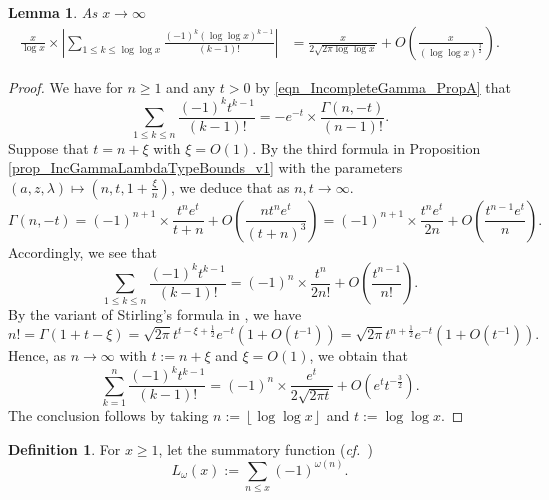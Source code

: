 \documentclass[11pt,reqno,a4letter]{article}
\newcommand{\hlocalref}[1]{\hyperref[#1]{\ref{#1}}}
\numberwithin{equation}{section}
\numberwithin{figure}{section}
\numberwithin{table}{section}
\newcommand{\cf}{\textit{cf.\ }}
\newcommand{\floor}[1]{\left\lfloor #1 \right\rfloor}
\theoremstyle{plain}
\newtheorem{lemma}[theorem]{Lemma}
\numberwithin{theorem}{section}
\theoremstyle{definition}
\newtheorem{definition}[theorem]{Definition}
\begin{document}
\begin{lemma}
\label{lemma_ConvenientIncGammaFuncTypePartialSumAsymptotics_v2}
As $x \rightarrow \infty$  
\begin{align*}
\frac{x}{\log x} \times \left\lvert \sum_{1 \leq k \leq \log\log x} 
     \frac{(-1)^k (\log\log x)^{k-1}}{(k-1)!} \right\rvert 
     & = \frac{x}{2\sqrt{2\pi \log\log x}} + O\left(\frac{x}{(\log\log x)^{\frac{3}{2}}}\right). 
\end{align*}
\end{lemma}
\begin{proof}
We have for $n \geq 1$ and any $t > 0$ by 
\eqref{eqn_IncompleteGamma_PropA} that 
\[
\sum_{1 \leq k \leq n} \frac{(-1)^k t^{k-1}}{(k-1)!} = -e^{-t} \times 
     \frac{\Gamma(n, -t)}{(n-1)!}. 
\]
Suppose that $t = n + \xi$ with $\xi = O(1)$. 
By the third formula 
in Proposition \hlocalref{prop_IncGammaLambdaTypeBounds_v1} 
with the parameters $(a, z, \lambda) \mapsto \left(n, t, 1 + \frac{\xi}{n}\right)$, 
we deduce that as $n,t \rightarrow \infty$. 
\begin{equation}
\label{eqn_ProofTag_lemma_ConvenientIncGammaFuncTypePartialSumAsymptotics_v2}
\Gamma(n, -t) = (-1)^{n+1} \times \frac{t^n e^{t}}{t+n} + 
     O\left(\frac{n t^n e^{t}}{(t+n)^3}\right) = 
     (-1)^{n+1} \times \frac{t^n e^t}{2n} + O\left(\frac{t^{n-1} e^t}{n}\right). 
\end{equation}
Accordingly, we see that 
\[
\sum_{1 \leq k \leq n} \frac{(-1)^k t^{k-1}}{(k-1)!} = 
     (-1)^{n} \times \frac{t^n}{2n!} + O\left(\frac{t^{n-1}}{n!}\right). 
\]
By the variant of Stirling's formula in \cite[\cf Eq.\ (5.11.8)]{NISTHB}, we have 
\[
n! = \Gamma(1 + t - \xi) = \sqrt{2\pi} t^{t-\xi+\frac{1}{2}} e^{-t} \left(1 + O\left(t^{-1}\right)\right) = 
     \sqrt{2\pi} t^{n+\frac{1}{2}} e^{-t} \left(1 + O\left(t^{-1}\right)\right). 
\]
Hence, as $n \rightarrow \infty$ with $t := n + \xi$ and $\xi = O(1)$, we obtain that 
\[
\sum_{k=1}^{n} \frac{(-1)^k t^{k-1}}{(k-1)!} = (-1)^n \times \frac{e^t}{2 \sqrt{2\pi t}} + 
     O\left(e^t t^{-\frac{3}{2}}\right). 
\]
The conclusion follows by taking $n := \floor{\log\log x}$ and $t := \log\log x$. 
\end{proof}

\begin{definition}
For $x \geq 1$, let the summatory function (\cf \cite{LUNE-DRESSLER}) 
\[
L_{\omega}(x) := \sum_{n \leq x} (-1)^{\omega(n)}. 
\]
\end{definition}
\end{document}

